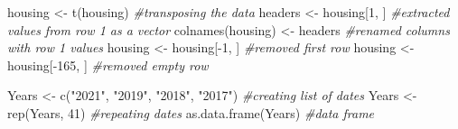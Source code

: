 \documentclass[
]{article}
\newenvironment{Shaded}{\begin{snugshade}}{\end{snugshade}}
\newcommand{\CommentTok}[1]{\textcolor[rgb]{0.56,0.35,0.01}{\textit{#1}}}
\newcommand{\DecValTok}[1]{\textcolor[rgb]{0.00,0.00,0.81}{#1}}
\newcommand{\FunctionTok}[1]{\textcolor[rgb]{0.00,0.00,0.00}{#1}}
\newcommand{\NormalTok}[1]{#1}
\newcommand{\OtherTok}[1]{\textcolor[rgb]{0.56,0.35,0.01}{#1}}
\newcommand{\SpecialCharTok}[1]{\textcolor[rgb]{0.00,0.00,0.00}{#1}}
\newcommand{\StringTok}[1]{\textcolor[rgb]{0.31,0.60,0.02}{#1}}
\begin{document}
\begin{Shaded}
\begin{Highlighting}[]
\NormalTok{housing }\OtherTok{\textless{}{-}} \FunctionTok{t}\NormalTok{(housing) }\CommentTok{\#transposing the data}
\NormalTok{headers }\OtherTok{\textless{}{-}}\NormalTok{ housing[}\DecValTok{1}\NormalTok{, ] }\CommentTok{\#extracted values from row 1 as a vector }
\FunctionTok{colnames}\NormalTok{(housing) }\OtherTok{\textless{}{-}}\NormalTok{ headers }\CommentTok{\#renamed columns with row 1 values}
\NormalTok{housing }\OtherTok{\textless{}{-}}\NormalTok{ housing[}\SpecialCharTok{{-}}\DecValTok{1}\NormalTok{, ] }\CommentTok{\#removed first row}
\NormalTok{housing }\OtherTok{\textless{}{-}}\NormalTok{ housing[}\SpecialCharTok{{-}}\DecValTok{165}\NormalTok{, ] }\CommentTok{\#removed empty row}
\end{Highlighting}
\end{Shaded}

\begin{Shaded}
\begin{Highlighting}[]
\NormalTok{Years }\OtherTok{\textless{}{-}} \FunctionTok{c}\NormalTok{(}\StringTok{"2021"}\NormalTok{, }\StringTok{"2019"}\NormalTok{, }\StringTok{"2018"}\NormalTok{, }\StringTok{"2017"}\NormalTok{) }\CommentTok{\#creating list of dates}
\NormalTok{Years }\OtherTok{\textless{}{-}} \FunctionTok{rep}\NormalTok{(Years, }\DecValTok{41}\NormalTok{) }\CommentTok{\#repeating dates}
\FunctionTok{as.data.frame}\NormalTok{(Years) }\CommentTok{\#data frame}
\end{Highlighting}
\end{Shaded}
\end{document}
